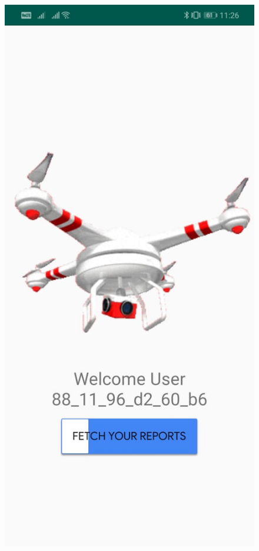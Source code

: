 \begin{figure}[H]
    \includegraphics[scale=0.17]{SummerInterReport/project/Images-Major/app3.jpeg}

\end{figure}
